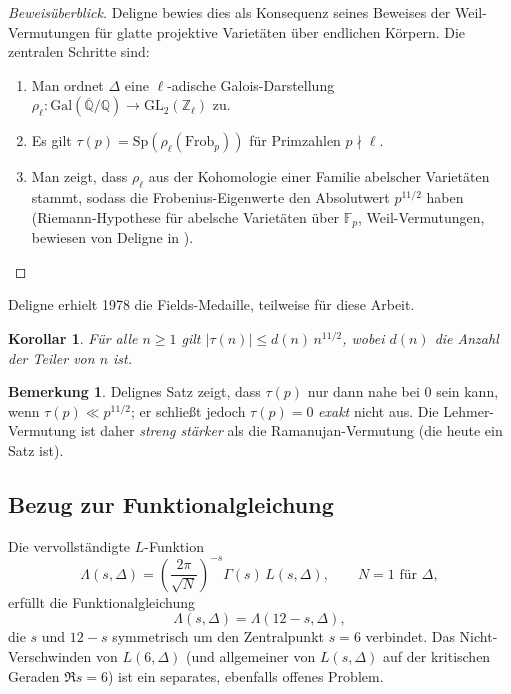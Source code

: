\documentclass[12pt,a4paper]{amsart}
\newtheorem{corollary}[theorem]{Korollar}
\theoremstyle{definition}
\newtheorem{remark}[theorem]{Bemerkung}
\begin{document}
\begin{proof}[Beweisüberblick]
  Deligne \cite{Deligne1974} bewies dies als Konsequenz seines Beweises der
  Weil-Vermutungen für glatte projektive Varietäten über endlichen Körpern.
  Die zentralen Schritte sind:
  \begin{enumerate}[label=(\roman*)]
    \item Man ordnet $\Delta$ eine $\ell$-adische Galois-Darstellung
          $\rho_\ell : \mathrm{Gal}(\overline{\mathbb{Q}}/\mathbb{Q}) \to
          \mathrm{GL}_2(\mathbb{Z}_\ell)$ zu.
    \item Es gilt $\tau(p) = \mathrm{Sp}(\rho_\ell(\mathrm{Frob}_p))$ für
          Primzahlen $p \nmid \ell$.
    \item Man zeigt, dass $\rho_\ell$ aus der Kohomologie einer Familie abelscher
          Varietäten stammt, sodass die Frobenius-Eigenwerte den Absolutwert
          $p^{11/2}$ haben (Riemann-Hypothese für abelsche Varietäten über
          $\mathbb{F}_p$, Weil-Vermutungen, bewiesen von Deligne in
          \cite{DelignePureI}).
  \end{enumerate}
\end{proof}

Deligne erhielt 1978 die Fields-Medaille, teilweise für diese Arbeit.

\begin{corollary}\label{cor:deligne-koeff}
  Für alle $n \geq 1$ gilt $|\tau(n)| \leq d(n)\, n^{11/2}$, wobei $d(n)$ die
  Anzahl der Teiler von $n$ ist.
\end{corollary}

\begin{remark}
  Delignes Satz zeigt, dass $\tau(p)$ nur dann nahe bei $0$ sein kann, wenn
  $\tau(p) \ll p^{11/2}$; er schließt jedoch $\tau(p) = 0$ \emph{exakt} nicht aus.
  Die Lehmer-Vermutung ist daher \emph{streng stärker} als die Ramanujan-Vermutung
  (die heute ein Satz ist).
\end{remark}

\subsection{Bezug zur Funktionalgleichung}

Die vervollständigte $L$-Funktion
\[
  \Lambda(s, \Delta) = \left(\frac{2\pi}{\sqrt{N}}\right)^{-s}
  \Gamma(s)\, L(s, \Delta), \qquad N = 1 \text{ für } \Delta,
\]
erfüllt die Funktionalgleichung
\[
  \Lambda(s, \Delta) = \Lambda(12-s, \Delta),
\]
die $s$ und $12-s$ symmetrisch um den Zentralpunkt $s = 6$ verbindet. Das
Nicht-Verschwinden von $L(6, \Delta)$ (und allgemeiner von $L(s, \Delta)$ auf der
kritischen Geraden $\Re s = 6$) ist ein separates, ebenfalls offenes Problem.
\end{document}
